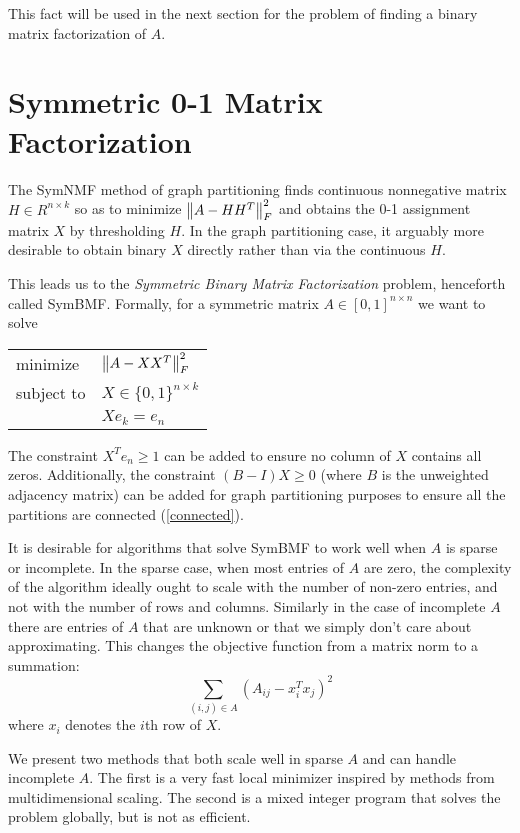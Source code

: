 This fact will be used in the next section for the problem of finding
a binary matrix factorization of $A$.


\section{Symmetric 0-1 Matrix Factorization}

The SymNMF method of graph partitioning finds continuous nonnegative
matrix $H \in R^{n \times k}$ so as to minimize $\left\lVert A - H H^T\right\rVert_F^2$
and obtains the 0-1 assignment matrix $X$ by thresholding $H$.
In the graph partitioning case, it arguably more desirable to obtain
binary $X$ directly rather than via the continuous $H$.

This leads us to the \textit{Symmetric Binary Matrix Factorization}
problem, henceforth called SymBMF. Formally, for a symmetric matrix
$A \in [0, 1]^{n \times n}$ we want to solve
\begin{center}
\begin{tabular}{l l}
minimize   & $\left\lVert A - X X^T\right\rVert_F^2$ \\
subject to & $X \in \{0, 1\}^{n \times k}$ \\
           & $X e_k = e_n$
\end{tabular}
\end{center}
The constraint $X^T e_n \geq 1$ can be added to ensure no column of $X$
contains all zeros. Additionally, the constraint $(B - I) X \geq 0$
(where $B$ is the unweighted adjacency matrix) can be added for graph
partitioning purposes to ensure all the partitions are connected
(\ref{connected}).

It is desirable for algorithms that solve SymBMF to work well when $A$
is sparse or incomplete. In the sparse case, when most entries of $A$
are zero, the complexity of the algorithm ideally ought to scale with
the number of non-zero entries, and not with the number of rows and
columns. Similarly in the case of incomplete $A$ there are entries of
$A$ that are unknown or that we simply don't care about approximating.
This changes the objective function from a matrix norm to a summation:
\[ \sum_{(i,j) \in A} (A_{ij} - x_i^T x_j)^2 \]
where $x_i$ denotes the $i$th row of $X$.

We present two methods that both scale well in sparse $A$ and can
handle incomplete $A$. The first is a very fast local minimizer
inspired by methods from multidimensional scaling. The second is a
mixed integer program that solves the problem globally, but is not
as efficient.

